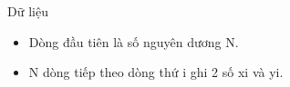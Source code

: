 Dữ liệu
\begin{itemize}
	\item     Dòng đầu tiên là số nguyên dương N.   
	\item     N dòng tiếp theo dòng thứ i ghi 2 số xi và yi.   
\end{itemize}